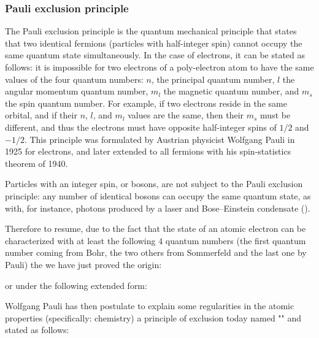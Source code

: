     \pagebreak
    \subsubsection{Pauli exclusion principle}\label{pauli exclusion principle}
    The Pauli exclusion principle is the quantum mechanical principle that states that two identical fermions (particles with half-integer spin) cannot occupy the same quantum state simultaneously. In the case of electrons, it can be stated as follows: it is impossible for two electrons of a poly-electron atom to have the same values of the four quantum numbers: $n$, the principal quantum number, $l$ the angular momentum quantum number, $m_l$ the magnetic quantum number, and $m_s$ the spin quantum number. For example, if two electrons reside in the same orbital, and if their $n$, $l$, and $m_l$ values are the same, then their $m_s$ must be different, and thus the electrons must have opposite half-integer spins of $1/2$ and $-1/2$. This principle was formulated by Austrian physicist Wolfgang Pauli in 1925 for electrons, and later extended to all fermions with his spin-statistics theorem of 1940.
    
    Particles with an integer spin, or bosons, are not subject to the Pauli exclusion principle: any number of identical bosons can occupy the same quantum state, as with, for instance, photons produced by a laser and Bose–Einstein condensate ().
    
    Therefore to resume, due to the fact that the state of an atomic electron can be characterized with at least the following $4$ quantum numbers (the first quantum number coming from Bohr, the two others from Sommerfeld and the last one by Pauli) the we have just proved the origin:
	
	or under the following extended form:
	
	Wolfgang Pauli has then postulate to explain some regularities in the atomic properties (specifically: chemistry) a principle of exclusion today named "" and stated as follows:

